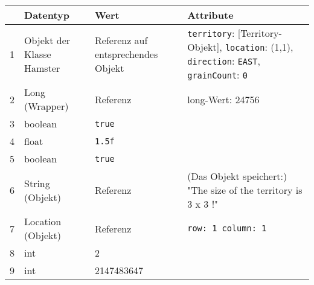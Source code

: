 \begin{table}[H]
	\begin{tabularx}{\linewidth}{ c | X| X| X }
		\arrayrulecolor{gray}
		\rowcolor{lightgray!30}
		  & Datentyp                  & Wert                               & Attribute                                                                                                                            \\
		\hline
		1 & Objekt der Klasse Hamster & Referenz auf entsprechendes Objekt & \texttt{territory}: [Territory-Objekt], \texttt{location}: (1,1), \texttt{direction}: \texttt{EAST}, \texttt{grainCount}: \texttt{0} \\ \hline
		2 & Long (Wrapper)            & Referenz                           & long-Wert: 24756                                                                                                                     \\ \hline
		3 & boolean                   & \texttt{true}                      &                                                                                                                                      \\ \hline
		4 & float                     & \texttt{1.5f}                      &                                                                                                                                      \\ \hline
		5 & boolean                   & \texttt{true}                      &                                                                                                                                      \\ \hline
		6 & String (Objekt)           & Referenz                           & (Das Objekt speichert:) "The size of the territory is 3 x 3 !"                                                                       \\ \hline
		7 & Location (Objekt)         & Referenz                           & \texttt{row: 1 column: 1}                                                                                                            \\ \hline
		8 & int                       & 2                                  &                                                                                                                                      \\ \hline
		9 & int                       & 2147483647                         &                                                                                                                                      \\
	\end{tabularx}
\end{table}

